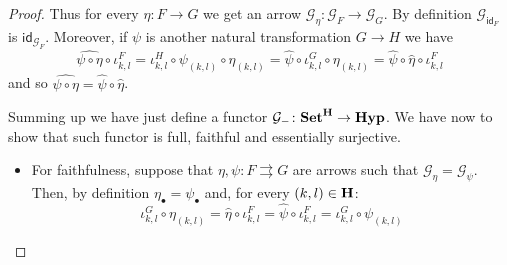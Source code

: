 \documentclass[3p]{elsarticle}
\newcommand{\catname}[1]{\textbf{\textup{#1}}}
\newcommand{\hyp}{\catname{Hyp}}
\newcommand{\id}[1]{\mathsf{id}_{#1}}
\theoremstyle{remark}
\theoremstyle{definition}
\begin{document}
\begin{proof}
	Thus for every $\eta\colon F\to G$ we get an arrow $\mathcal{G}_{\eta}\colon \mathcal{G}_F\to \mathcal{G}_G$. By definition $\mathcal{G}_{\id{F}}$ is $\id{\mathcal{G}_F}$. Moreover, if $\psi$ is another natural transformation $G\to H$ we have 
	\[\hat{\psi\circ \eta}\circ \iota^{F}_{k,l}=\iota^{H}_{k,l}\circ \psi_{(k,l)}\circ \eta_{(k,l)} = \hat{\psi}\circ \iota^G_{k,l}\circ \eta_{(k,l)} = \hat{\psi}\circ \hat{\eta}\circ \iota^{F}_{k,l}\]
	and so $\hat{\psi\circ \eta}=\hat{\psi}\circ \hat{\eta}$.
	
	Summing up we have just define a functor $\mathcal{G}_{-}\colon \catname{Set}^{\catname{H}}\to \hyp$. We have now to show that such functor is full, faithful and essentially surjective.
	\begin{itemize}
		\item For faithfulness, suppose that $\eta, \psi\colon F\rightrightarrows G$ are arrows such that $\mathcal{G}_\eta = \mathcal{G}_\psi$. Then, by definition $\eta_{\bullet}=\psi_{\bullet}$ and, for every $(k,l)\in \catname{H}$:
		\[\iota^G_{k,l}\circ \eta_{(k,l)} = \hat{\eta}\circ \iota^F_{k,l}=\hat{\psi}\circ \iota^F_{k,l} = \iota^G_{k,l}\circ \psi_{(k,l)} \]
		

\end{itemize}
\end{proof}
\end{document}
